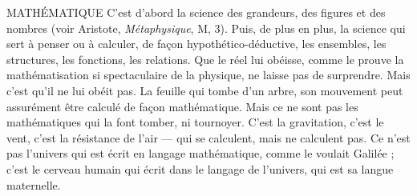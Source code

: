 MATHÉMATIQUE C’est d’abord la science des grandeurs, des figures et
des nombres (voir Aristote, {\it Métaphysique}, M, 3). Puis,
de plus en plus, la science qui sert à penser ou à calculer, de façon hypothético-déductive,
les ensembles, les structures, les fonctions, les relations. Que le réel
lui obéisse, comme le prouve la mathématisation si spectaculaire de la physique,
ne laisse pas de surprendre. Mais c’est qu’il ne lui obéit pas. La feuille qui
tombe d’un arbre, son mouvement peut assurément être calculé de façon
mathématique. Mais ce ne sont pas les mathématiques qui la font tomber, ni
tournoyer. C’est la gravitation, c’est le vent, c’est la résistance de l’air — qui se
calculent, mais ne calculent pas.
Ce n’est pas l’univers qui est écrit en langage mathématique, comme le
voulait Galilée ; c’est le cerveau humain qui écrit dans le langage de l’univers,
qui est sa langue maternelle.

